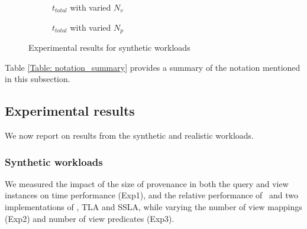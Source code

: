 \begin{figure}
\begin{subfigure}{0.30\textwidth}
        \caption{$t_{total}$ with varied $N_v$}
        \label{fig:stress_test_view_num}
    \end{subfigure}
    \hfill
    \begin{subfigure}{0.30\textwidth}
    \hspace*{-0.8cm}
        \caption{$t_{total}$ with varied $N_p$}
        \label{fig:stress_test_predicate_num_time}
    \end{subfigure}
    \caption{Experimental results for synthetic workloads}
\end{figure}

Table \ref{Table: notation_summary} provides a summary of the notation mentioned in this subsection.%

\subsection{Experimental results}
We now report on results from the synthetic and realistic workloads.

\subsubsection{Synthetic workloads} \label{sec: synthetic_exp}
We measured the impact of the size of provenance in both the query and view instances on time performance (Exp1), and the relative performance of \provalg\ and two implementations of \rba, TLA and SSLA,  while varying the number of view mappings (Exp2) and number of view predicates (Exp3).

